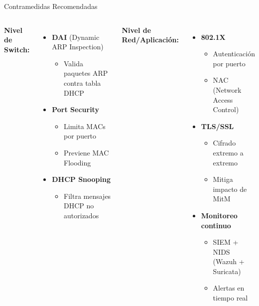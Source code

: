 \documentclass[aspectratio=169, 11pt]{beamer}
\begin{document}
\begin{frame}{Contramedidas Recomendadas}
\begin{columns}[T]
\textbf{Nivel de Switch:}
\begin{itemize}
    \item \textbf{DAI} (Dynamic ARP Inspection)
    \begin{itemize}
        \item Valida paquetes ARP contra tabla DHCP
    \end{itemize}
    \item \textbf{Port Security}
    \begin{itemize}
        \item Limita MACs por puerto
        \item Previene MAC Flooding
    \end{itemize}
    \item \textbf{DHCP Snooping}
    \begin{itemize}
        \item Filtra mensajes DHCP no autorizados
    \end{itemize}
\end{itemize}

\textbf{Nivel de Red/Aplicaci\'on:}
\begin{itemize}
    \item \textbf{802.1X}
    \begin{itemize}
        \item Autenticaci\'on por puerto
        \item NAC (Network Access Control)
    \end{itemize}
    \item \textbf{TLS/SSL}
    \begin{itemize}
        \item Cifrado extremo a extremo
        \item Mitiga impacto de MitM
    \end{itemize}
    \item \textbf{Monitoreo continuo}
    \begin{itemize}
        \item SIEM + NIDS (Wazuh + Suricata)
        \item Alertas en tiempo real
    \end{itemize}
\end{itemize}
\end{columns}
\end{frame}
\end{document}
